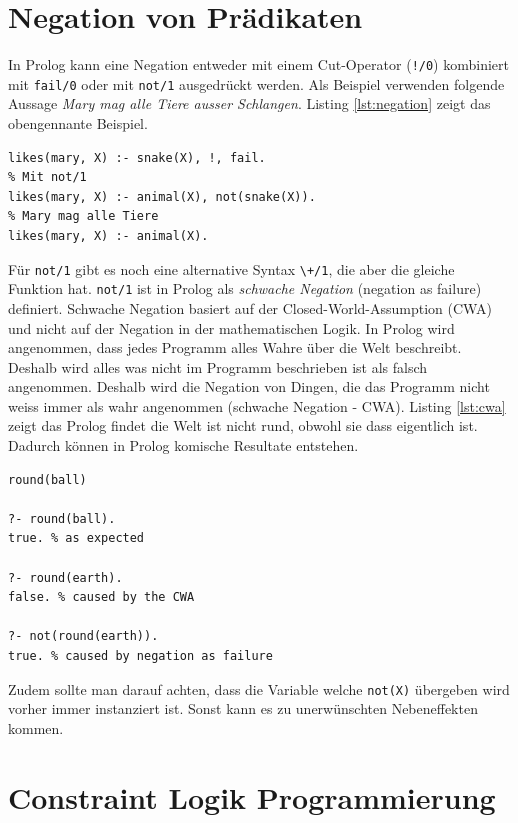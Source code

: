 \section{Negation von Prädikaten}

In Prolog kann eine Negation entweder mit einem Cut-Operator (\verb|!/0|) kombiniert mit \verb|fail/0| oder mit \verb|not/1| ausgedrückt werden. Als Beispiel verwenden folgende Aussage \textit{Mary mag alle Tiere ausser Schlangen}. Listing \ref{lst:negation} zeigt das obengennante Beispiel.

\begin{lstlisting}[caption=Negation, label=lst:negation]
% Wenn X eine Schlange unterbreche Backtracking und Regel ist falsch
likes(mary, X) :- snake(X), !, fail.
% Mit not/1
likes(mary, X) :- animal(X), not(snake(X)).
% Mary mag alle Tiere
likes(mary, X) :- animal(X).
\end{lstlisting}

Für \verb|not/1| gibt es noch eine alternative Syntax \verb|\+/1|, die aber die gleiche Funktion hat. \verb|not/1| ist in Prolog als \textit{schwache Negation} (negation as failure) definiert. Schwache Negation basiert auf der Closed-World-Assumption (CWA) und nicht auf der Negation in der mathematischen Logik. In Prolog wird angenommen, dass jedes Programm alles Wahre über die Welt beschreibt. Deshalb wird alles was nicht im Programm beschrieben ist als falsch angenommen. Deshalb wird die Negation von Dingen, die das Programm nicht weiss immer als wahr angenommen (schwache Negation - CWA). Listing \ref{lst:cwa} zeigt das Prolog findet die Welt ist nicht rund, obwohl sie dass eigentlich ist. Dadurch können in Prolog komische Resultate entstehen.

\begin{lstlisting}[caption=CWA, label=lst:cwa]
round(ball)

?- round(ball).
true. % as expected

?- round(earth).
false. % caused by the CWA

?- not(round(earth)).
true. % caused by negation as failure
\end{lstlisting}

Zudem sollte man darauf achten, dass die Variable welche \verb|not(X)| übergeben wird vorher immer instanziert ist. Sonst kann es zu unerwünschten Nebeneffekten kommen.

\section{Constraint Logik Programmierung}

